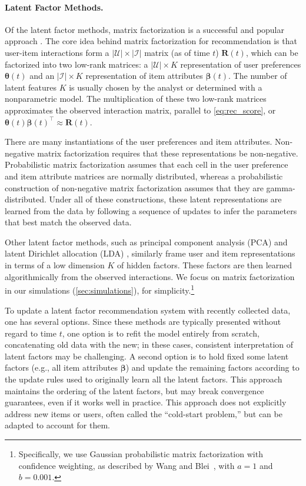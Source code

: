 \documentclass[sigconf]{acmart}
\begin{document}
\paragraph{Latent Factor Methods.}
Of the latent factor methods, matrix factorization is a successful and popular approach \citep{Koren09}. 
The core idea behind matrix factorization for recommendation is that user-item interactions form a $|\mathcal{U}| \times |\mathcal{I}|$ matrix (as of time $t$) $\mathbf{R}(t)$, which can be factorized into two low-rank matrices: a $|\mathcal{U}| \times K$ representation of user preferences $\boldsymbol{\theta}(t)$ and an $|\mathcal{I}| \times K$ representation of item attributes $\boldsymbol{\beta}(t)$.  The number of latent features $K$ is usually chosen by the analyst or determined with a nonparametric model.  The multiplication of these two low-rank matrices approximates the observed interaction matrix, parallel to \cref{eq:rec_score}, or
$\boldsymbol{\theta}(t) \boldsymbol{\beta}(t)^\top\approx\mathbf{R}(t)$.

There are many instantiations of the user preferences and item attributes.
Non-negative matrix factorization \citep{Lee00} requires that these representations be non-negative.  Probabilistic matrix factorization \citep{PMF} assumes that each cell in the user preference and item attribute matrices are normally distributed, whereas a probabilistic construction of non-negative matrix factorization \citep{CannyGaP} assumes that they are gamma-distributed.  Under all of these constructions, these latent representations are learned from the data by following a sequence of updates to infer the parameters that best match the observed data.

Other latent factor methods, such as principal component analysis (PCA) \citep{jolliffe2002principal} and latent Dirichlet allocation (LDA) \citep{Blei:2003}, similarly frame user and item representations in terms of a low dimension $K$ of hidden factors.  These factors are then learned algorithmically from the observed interactions. We focus on matrix factorization in our simulations (\cref{sec:simulations}), for simplicity.\footnote{Specifically, we use Gaussian probabilistic matrix factorization with confidence weighting, as described by Wang and Blei~\citep{CTR}, with $a=1$ and $b=0.001$.}

To update a latent factor recommendation system with recently collected data, one has several options.  Since these methods are typically presented without regard to time $t$, one option is to refit the model entirely from scratch, concatenating old data with the new; in these cases, consistent interpretation of latent factors may be challenging.
A second option is to hold fixed some latent factors (e.g., all item attributes $\boldsymbol{\beta}$) and update the remaining factors according to the update rules used to originally learn all the latent factors.  This approach maintains the ordering of the latent factors, but may break convergence guarantees, even if it works well in practice.
This approach does not explicitly address new items or users, often called the ``cold-start problem,'' but can be adapted to account for them.
\end{document}
